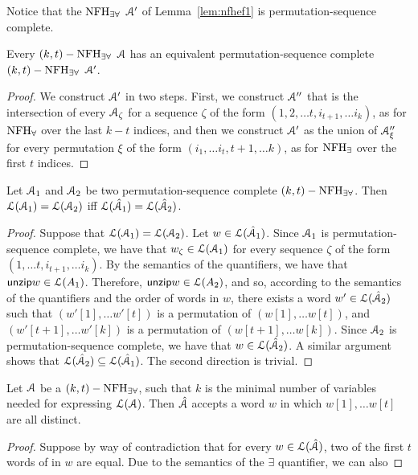 {Notice that the $\textrm{NFH}_{\exists\forall}$ $\mathcal{A}'$ of Lemma~\ref{lem:nfhef1} is permutation-sequence complete.

\begin{lemma}
Every $(k,t)-\textrm{NFH}_{\exists\forall}$ $\mathcal{A}$ has an equivalent permutation-sequence complete $(k,t)-\textrm{NFH}_{\exists\forall}$ $\mathcal{A}'$.
\end{lemma}
\begin{proof}
We construct $\mathcal{A}'$ in two steps. 
First, we construct $\mathcal{A}''$ that is the intersection of every $\mathcal{A}_\zeta$ for a sequence $\zeta$ of the form $(1,2,\ldots t, i_{t+1},\ldots i_k)$, as for $\textrm{NFH}_{\forall}$ over the last $k-t$ indices, and then we construct $\mathcal{A}'$ as the union of $\mathcal{A}''_\xi$ for every permutation $\xi$ of the form $(i_1,\ldots i_t,t+1,\ldots k)$, as for $\textrm{NFH}_{\exists}$ over the first $t$ indices.
\end{proof}

\begin{lemma}
Let $\mathcal{A}_1$ and $\mathcal{A}_2$ be two permutation-sequence complete $(k,t)-\textrm{NFH}_{\exists\forall}$.
Then $\mathcal{L}(\mathcal{A}_1)=\mathcal{L}(\mathcal{A}_2)$ iff  $\mathcal{L}(\hat{\mathcal{A}}_1) = \mathcal{L}(\hat {\mathcal{A}}_2)$.
\end{lemma}
\begin{proof}
Suppose that $\mathcal{L}(\mathcal{A}_1)=\mathcal{L}(\mathcal{A}_2)$. Let $w\in\mathcal{L}(\hat{\mathcal{A}}_1)$. 
Since $\mathcal{A}_1$ is permutation-sequence complete, we have that $w_\zeta\in\mathcal{L}(\mathcal{A}_1)$ for every sequence $\zeta$ of the form $(1,\ldots t,i_{t+1},\ldots i_k)$. By the semantics of the quantifiers, we have that $\mathsf{unzip}{w}\in\mathcal{L}(A_1)$.
Therefore, $\mathsf{unzip}{w}\in\mathcal{L}(A_2)$, and so, according to the semantics of the quantifiers and the order of words in $w$, 
there exists a word $w'\in\mathcal{L}(\hat{\mathcal{A}}_2)$ such that $(w'[1],\ldots w'[t])$ is a permutation of $(w[1],\ldots w[t])$, and $(w'[t+1],\ldots w'[k])$ is a permutation of $(w[t+1],\ldots w[k])$. Since $\mathcal{A}_2$ is permutation-sequence complete, we have that $w\in\mathcal{L}(\hat{\mathcal{A}}_2)$. A similar argument shows that $\mathcal{L}(\hat{\mathcal{A}}_2)\subseteq \mathcal{L}(\hat{\mathcal{A}}_1)$.
The second direction is trivial.
\end{proof}

\begin{lemma}
Let $\mathcal{A}$ be a $(k,t)-\textrm{NFH}_{\exists\forall}$, such that $k$ is the minimal number of variables needed for expressing $\mathcal{L}(\mathcal{A})$.
Then $\hat{\mathcal{A}}$ accepts a word $w$ in which $w[1],\ldots w[t]$ are all distinct. 
\end{lemma}
\begin{proof}
Suppose by way of contradiction that for every $w\in\mathcal{L}(\hat{\mathcal{A}})$, two of the first $t$ words of in $w$ are equal. Due to the semantics of the $\exists$ quantifier, we can also 
\end{proof}


}
